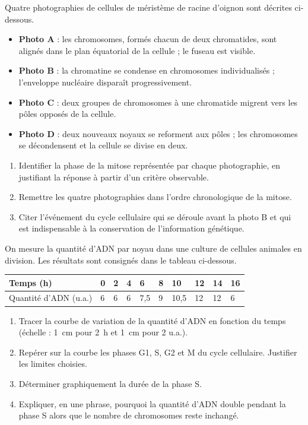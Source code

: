 \documentclass[11pt]{article}
\begin{document}
\begin{exercice}
Quatre photographies de cellules de méristème de racine d'oignon sont décrites ci-dessous.
\begin{itemize}
\item \textbf{Photo A} : les chromosomes, formés chacun de deux chromatides, sont alignés dans le plan équatorial de la cellule ; le fuseau est visible.
\item \textbf{Photo B} : la chromatine se condense en chromosomes individualisés ; l'enveloppe nucléaire disparaît progressivement.
\item \textbf{Photo C} : deux groupes de chromosomes à une chromatide migrent vers les pôles opposés de la cellule.
\item \textbf{Photo D} : deux nouveaux noyaux se reforment aux pôles ; les chromosomes se décondensent et la cellule se divise en deux.
\end{itemize}
\begin{enumerate}
\item Identifier la phase de la mitose représentée par chaque photographie, en justifiant la réponse à partir d'un critère observable.
\item Remettre les quatre photographies dans l'ordre chronologique de la mitose.
\item Citer l'événement du cycle cellulaire qui se déroule avant la photo B et qui est indispensable à la conservation de l'information génétique.
\end{enumerate}
\end{exercice}

\begin{exercice}
On mesure la quantité d'ADN par noyau dans une culture de cellules animales en division. Les résultats sont consignés dans le tableau ci-dessous.
\begin{center}
\begin{tabularx}{\linewidth}{|l|X|X|X|X|X|X|X|X|X|}
\hline
\rowcolor{popblueL} Temps (h) & 0 & 2 & 4 & 6 & 8 & 10 & 12 & 14 & 16 \\
\hline
Quantité d'ADN (u.a.) & 6 & 6 & 6 & 7,5 & 9 & 10,5 & 12 & 12 & 6 \\
\hline
\end{tabularx}
\end{center}
\begin{enumerate}
\item Tracer la courbe de variation de la quantité d'ADN en fonction du temps (échelle : \SI{1}{cm} pour \SI{2}{h} et \SI{1}{cm} pour 2 u.a.).
\item Repérer sur la courbe les phases G1, S, G2 et M du cycle cellulaire. Justifier les limites choisies.
\item Déterminer graphiquement la durée de la phase S.
\item Expliquer, en une phrase, pourquoi la quantité d'ADN double pendant la phase S alors que le nombre de chromosomes reste inchangé.
\end{enumerate}
\end{exercice}
\end{document}
